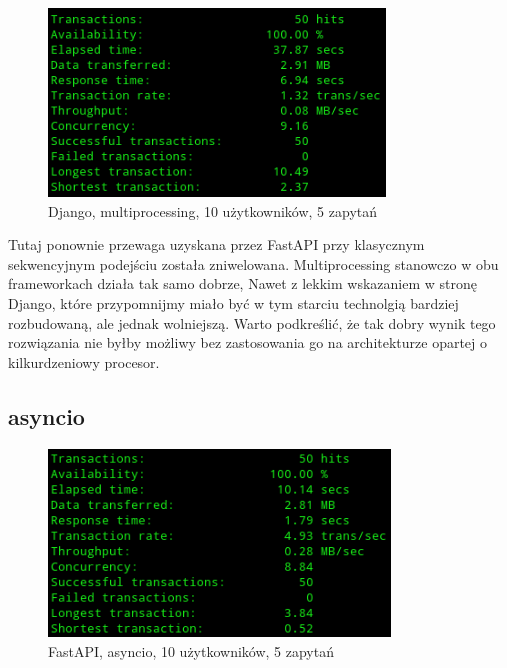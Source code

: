 \begin{figure}[H]
    \includegraphics[height=50mm]{zdjecia/10_req_process_django}
    \centering
    \caption{Django, multiprocessing, 10 użytkowników, 5 zapytań}
\end{figure}

Tutaj ponownie przewaga uzyskana przez FastAPI przy klasycznym sekwencyjnym podejściu została zniwelowana. Multiprocessing stanowczo w obu frameworkach działa tak samo dobrze, Nawet z lekkim wskazaniem w stronę Django, które przypomnijmy miało być w tym starciu technolgią bardziej rozbudowaną, ale jednak wolniejszą. Warto podkreślić, że tak dobry wynik tego rozwiązania nie byłby możliwy bez zastosowania go na architekturze opartej o kilkurdzeniowy procesor.

\subsection{asyncio}
\begin{figure}[H]
    \includegraphics[height=50mm]{zdjecia/10_req_asyncio_fast}
    \centering
    \caption{FastAPI, asyncio, 10 użytkowników, 5 zapytań}
\end{figure}

